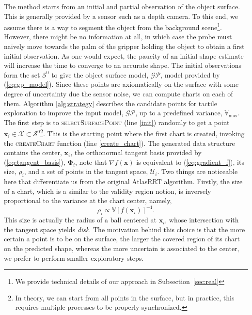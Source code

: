 The method starts from an initial and partial observation of the object surface. This is generally provided by a sensor such as a depth camera. To this end, we assume there is a way to segment the object from the background scene\footnote{We provide technical details of our approach in Subsection~\ref{sec:real}}. However, there might be no information at all, in which case the probe must naively move towards the palm of the gripper holding the object to obtain a first initial observation. As one would expect, the paucity of an initial shape estimate will increase the time to converge to an accurate shape. The initial observations form the set $\mathcal{S}^0$ to give the object surface model, $\mathcal{GP}$, model provided by (\ref{eq:gp_model}). Since these points are axiomatically on the surface with some degree of uncertainty due the sensor noise, we can compute charts on each of them.
Algorithm \ref{alg:strategy} describes the candidate points for tactile exploration to improve the input model, $\mathcal{GP}$, up to a predefined variance, $\mathbb{V}_{\max}$. 
The first step is to \textsc{selectSurfacePoint} (line \ref{init}) randomly to get a point $\mathbf{x}_i \in \mathcal{X} \subset \mathcal{S}^0$\footnote{In theory, we can start from all points in the surface, but in practice, this requires multiple processes to be properly synchronized.}. This is the starting point where the first chart is created, invoking the \textsc{createChart} function (line \ref{create_chart}). The generated data structure contains the center, $\mathbf{x}_i$, the orthonormal tangent basis provided by (\ref{eq:tangent_basis}), $\boldsymbol{\Phi}_i$, note that $\nabla f(\mathbf{x})$ is equivalent to (\ref{eq:gradient_f}), its size, $\rho_i$, and a set of points in the tangent space, $\mathcal{U}_i$. Two things are noticeable here that differentiate us from the original AtlasRRT algorithm. Firstly, the size of a chart, which is a similar to the validity region notion, is inversely proportional to the variance at the chart center, namely,
\begin{equation}
\rho_i \propto \mathbb{V}[f(\mathbf{x}_i)]^{-1}.
\end{equation}
This size is actually the radius of a ball centered at $\mathbf{x}_i$, whose intersection with the tangent space yields \emph{disk}. The motivation behind this choice is that the more certain a point is to be on the surface, the larger the covered region of its chart on the predicted shape, whereas the more uncertain is associated to the center, we prefer to perform smaller exploratory steps.
